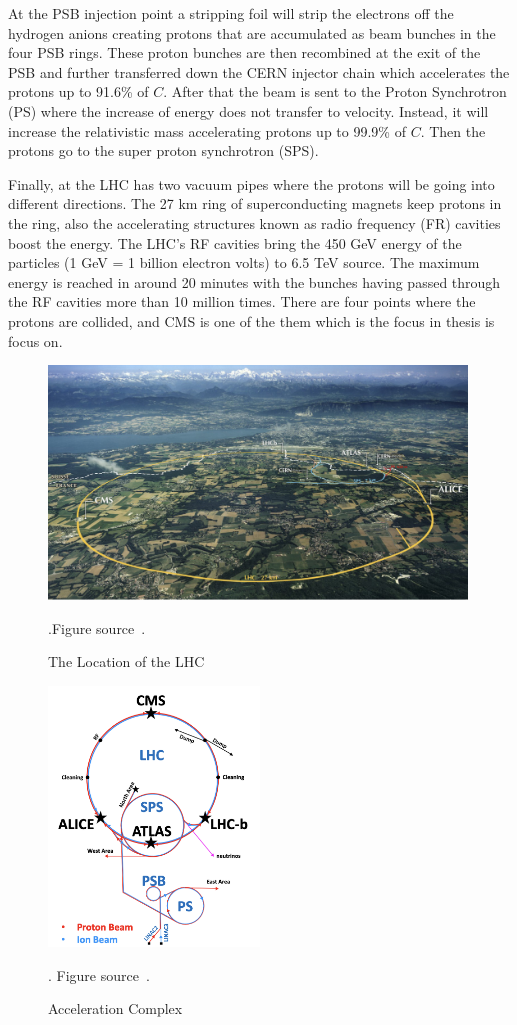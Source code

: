 At the PSB injection point a stripping foil will strip the electrons off the hydrogen anions creating protons that are accumulated as beam bunches in the four PSB rings. These proton bunches are then recombined at the exit of the PSB and further transferred down the CERN injector chain which accelerates the protons up to 91.6\% of $C$. After that the beam is sent to the Proton Synchrotron (PS) where the increase of energy does not transfer to velocity. Instead, it will increase the relativistic mass accelerating protons up to 99.9\% of $C$. Then the protons go to the super proton synchrotron (SPS).

Finally, at the LHC has two vacuum pipes where the protons will be going into different directions. The 27 km ring of superconducting magnets keep protons in the ring, also the accelerating structures known as radio frequency (FR) cavities boost the energy. The LHC’s RF cavities bring the 450 GeV energy of the particles (1 GeV = 1 billion electron volts) to 6.5 TeV source.
The maximum energy is reached in around 20 minutes with the bunches having passed through the RF cavities more than 10 million times.
There are four  points where the protons are collided, and CMS is one of the them which is the focus in thesis is focus on. 

\begin{figure}[t!]
\centering
\includegraphics[width=0.99\textwidth]{figures/LHC_location.png}
\caption{The Location of the LHC}.Figure source~\cite{SMtable}.
\label{fig:LHC_location}
\end{figure}

\begin{figure}[t!]
\centering
\includegraphics[width=0.50\textwidth]{figures/acceleration_chain.png}
\caption{Acceleration Complex}. Figure source~\cite{SMtable}.
\label{fig:acceleration_complex}
\end{figure} 
   



